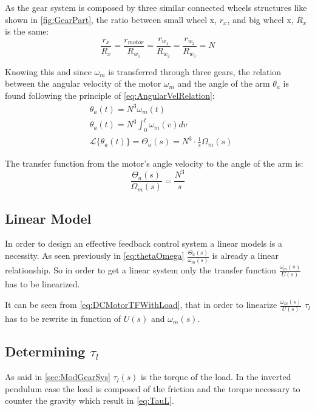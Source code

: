 As the gear system is composed by three similar connected wheels structures like shown in \autoref{fig:GearPart}, the ratio between small wheel x, $r_x$, and big wheel x, $R_x$ is the same:
\begin{equation}
	\frac{r_x}{R_x} = \frac{r_{motor}}{R_{w_1}} = \frac{r_{w_1}}{R_{w_2}} = \frac{r_{w_2}}{R_{w_3}} = N
\end{equation}

Knowing this and since $\omega_m$ is transferred through three gears, the relation between the angular velocity of the motor $\omega_m$ and the angle of the arm $\theta_a$ is found following the principle of \autoref{eq:AngularVelRelation}:
\begin{subequations} \label{eq:tech_ToA}
	\begin{flalign}
		&\dot{\theta}_a(t) = N^3 \omega_m(t) \\
		&\dot{\theta}_a(t) = N^3 \int_{0}^{t}\omega_m(v) dv \\
		&\mathcal{L}\{\dot{\theta}_a(t)\} = \Theta_a(s) = N^3 \cdot \frac{1}{s} \Omega_m(s)
	\end{flalign}
\end{subequations}

The transfer function from the motor's angle velocity to the angle of the arm is:
\begin{equation}\label{eq:thetaOmega}
	\frac{\Theta_a(s)}{\Omega_m(s)} =  \frac{N^3}{s}
\end{equation}

\subsection{Linear Model}

In order to design an effective feedback control system a linear models is a necessity. As seen previously in \autoref{eq:thetaOmega} $\frac{\Theta_a(s)}{\omega_m(s)}$ is already a linear relationship. So in order to get a linear system only the transfer function $\frac{\omega_m(s)}{U(s)}$ has to be linearized.

It can be seen from \autoref{eq:DCMotorTFWithLoad}, that in order to linearize $\frac{\omega_m(s)}{U(s)}$ $\tau_l$ has to be rewrite in function of $U(s)$ and $\omega_m(s)$.

\subsection{Determining $\tau_l$}
As said in \autoref{sec:ModGearSys} $\tau_l(s)$ is the torque of the load. In the inverted pendulum case the load is composed of the friction and the torque necessary to counter the gravity which result in \autoref{eq:TauL}.

